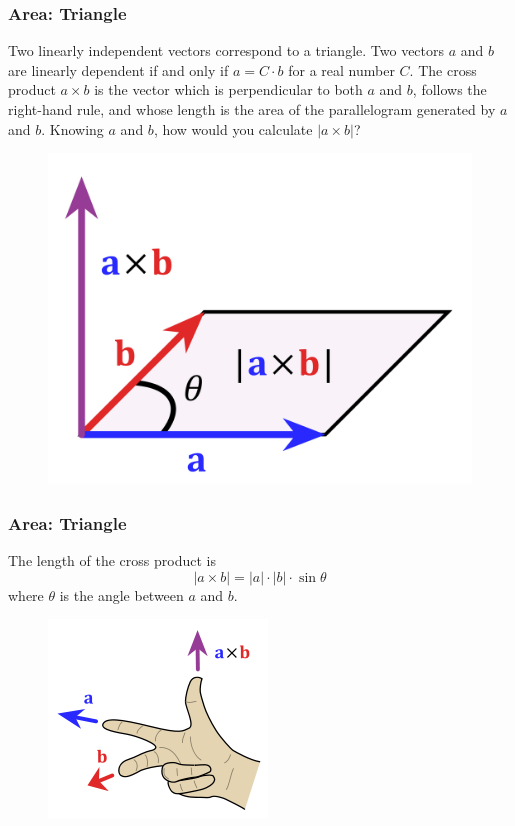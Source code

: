 \documentclass[xcolor=dvipsnames]{beamer}
\begin{document}
\begin{frame}
  \frametitle{Area: Triangle}
  Two linearly independent vectors correspond to a triangle. Two
  vectors $a$ and $b$ are \alert{linearly dependent} if and only if
  $a=C\cdot{}b$ for a real number $C$. The cross product $a\times{}b$
  is the vector which is perpendicular to both $a$ and $b$, follows
  the right-hand rule, and whose length is the area of the
  parallelogram generated by $a$ and $b$. Knowing $a$ and $b$, how
  would you calculate $|a\times{}b|$?
  \begin{figure}[h]
    \includegraphics[scale=.08]{./Gyvro.png}
  \end{figure}
\end{frame}

\begin{frame}
  \frametitle{Area: Triangle}
The length of the cross product is
\begin{equation}
  \label{eq:xoociegh}
|a\times{}b|=|a|\cdot{}|b|\cdot\sin\theta
\end{equation}
where $\theta$ is the angle between $a$ and $b$.
  \begin{figure}[h]
    \includegraphics[scale=.7]{./right_hand_rule_cross_product.png}
  \end{figure}
\end{frame}
\end{document}
